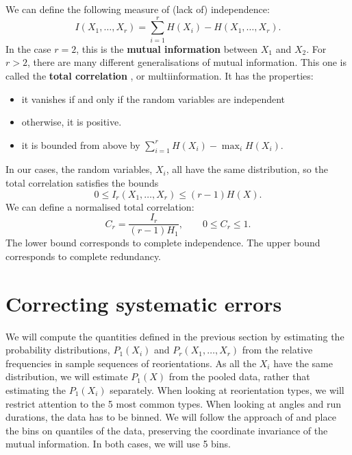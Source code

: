 \documentclass[12pt]{article}
\begin{document}
We can define the following measure of (lack of) independence:
%
\begin{equation}\label{eq:mutinf}
  I(X_1,\ldots,X_r) = \sum_{i=1}^r H(X_i) - H(X_1,\ldots,X_r).
\end{equation}
%
In the case $r=2$, this is the \textbf{mutual information} between $X_1$ and $X_2$. For $r>2$, there are many different generalisations of mutual information. This one is called the \textbf{total correlation} \cite{Watanabe:1960:ITA:1661258.1661265}, or multiinformation. It has the properties:
%
\begin{itemize}
  \item it vanishes if and only if the random variables are independent
  \item otherwise, it is positive.
  \item it is bounded from above by $\sum_{i=1}^r H(X_i) - \max_i H(X_i)$.
\end{itemize}
%

In our cases, the random variables, $X_i$, all have the same distribution, so the total correlation satisfies the bounds
%
\begin{equation}\label{eq:mutinfbounds}
  0 \leq I_r(X_1,\ldots,X_r) \leq (r-1)H(X).
\end{equation}
%
We can define a normalised total correlation:
%
\begin{equation}\label{eq:normmutinf}
  C_r = \frac{I_r}{(r-1)H_1}, \qquad 0 \leq C_r \leq 1.
\end{equation}
%
The lower bound corresponds to complete independence. The upper bound corresponds to complete redundancy.


\section{Correcting systematic errors}\label{sec:syscorr}

We will compute the quantities defined in the previous section by estimating the probability distributions, $P_1(X_i)$ and $P_r(X_1,\ldots,X_r)$ from the relative frequencies in sample sequences of reorientations. As all the $X_i$ have the same distribution, we will estimate $P_1(X)$ from the pooled data, rather that estimating the $P_1(X_i)$ separately. When looking at reorientation types, we will restrict attention to the 5 most common types. When looking at angles and run durations, the data has to be binned. We will follow the approach of \cite{2005cs........2017S} and place the bins on quantiles of the data, preserving the coordinate invariance of the mutual information. In both cases, we will use 5 bins.
\end{document}

